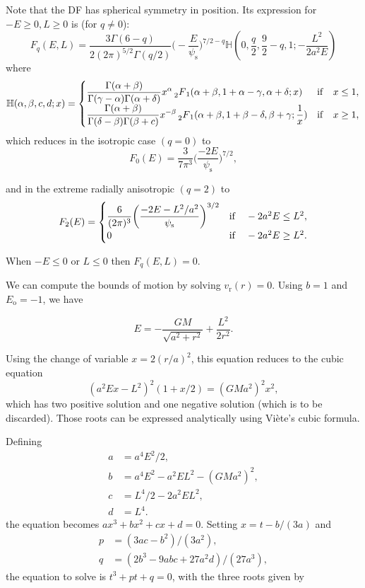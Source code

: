 \documentclass[11pt]{article}
\newcommand{\rs}{\mathrm{s}}
\newcommand{\rr}{\mathrm{r}}
\newcommand{\ro}{\mathrm{o}}
\newcommand{\psis}{\psi_{\rs}}
\newcommand{\vr}{v_{\rr}}
\newcommand{\Eo}{E_{\ro}}
\newcommand{\Fq}{F_{q}}
\newcommand{\mH}{\mathbb{H}}
\newcommand{\HG}{\prescript{}{2}F_{1}}
\begin{document}
Note that the DF has spherical symmetry in position. Its expression for $-E \geq 0, L \geq 0$
is (for $q \neq0$):
\begin{equation}
  \Fq(E,L)=\frac{3\Gamma(6-q)}{2(2\pi)^{5/2}\Gamma(q/2)}\bigg(-\frac{E}{\psis}\bigg)^{7/2-q}\mH(0,\frac{q}{2},\frac{9}{2}-q,1;-\frac{L^{2}}{2a^{2}E})
  \label{eq:def_Fq}
\end{equation}
where
\begin{equation}
\mH(\alpha,\beta,c,d;x)=\begin{cases}
\displaystyle{\frac{\Gamma(\alpha+\beta)}{\Gamma(\gamma-\alpha)\Gamma(\alpha+\delta)}x^{\alpha} \HG(\alpha+\beta,1+\alpha-\gamma,\alpha+\delta;x)} & {\rm{if}} \quad x\leq1 ,\\
\displaystyle{\frac{\Gamma(\alpha+\beta)}{\Gamma(\delta-\beta)\Gamma(\beta+c)}x^{-\beta} \HG(\alpha+\beta,1+\beta-\delta,\beta+\gamma;\frac{1}{x})} &{\rm{if}} \quad x\geq1 ,
\end{cases}
\label{eq:def_H}
\end{equation}
which reduces in the isotropic case $(q=0)$ to
\begin{equation}
  F_{0}(E)=\frac{3}{7\pi^{3}}\bigg(\frac{-2E}{\psis}\bigg)^{7/2} ,
  \label{eq:F_q=0}
\end{equation}

and in the extreme radially anisotropic $(q=2)$ to
\begin{equation}
  F_{2}(E)=\begin{cases}
\displaystyle{ \frac{6}{(2\pi)^{3}}\bigg(\frac{-2E-L^{2}/a^{2}}{\psis}\bigg)^{3/2}} & {\rm{if}} \quad -2 a^{2}E\leq L^{2} ,\\
0 &{\rm{if}} \quad - 2a^{2} E\geq L^{2} .
\end{cases}
  \label{eq:F_q=2}
\end{equation}

When $-E \leq 0$ or $L \leq 0$ then $\Fq(E,L) = 0$.

We can compute the bounds of motion by solving $\vr(r)=0$. Using $b=1$ and $\Eo=-1$, we have

$$E=-\frac{GM}{\sqrt{a^{2}+r^{2}}} + \frac{L^{2}}{2r^{2}} .$$

Using the change of variable $x=2(r/a)^{2}$, this equation reduces to the cubic equation
$$(a^{2}Ex-L^{2})^{2}(1+x/2) =(GMa^{2})^{2} x^{2},$$
which has two positive solution and one negative solution (which is to be discarded). Those roots can be expressed analytically using Viète's cubic formula.

Defining
\begin{align*}
  a &= a^{4}E^{2}/2, \\
  b &= a^{4}E^{2}-a^{2}EL^{2}-(GMa^{2})^{2} ,\\
  c &= L^{4}/2-2a^{2}EL^{2} ,\\
  d &= L^{4} .
\end{align*}
the equation becomes $a x^{3}+b x^{2}+c x+d = 0$. Setting $x=t-b/(3a)$ and
\begin{align*}
  p &= (3ac -b^{2})/(3a^{2}), \\
  q &= (2b^{3}-9abc+27a^{2}d)/(27a^{3}) ,
  \end{align*}
the equation to solve is $t^{3}+pt+q=0$, with the three roots given by
\end{document}
